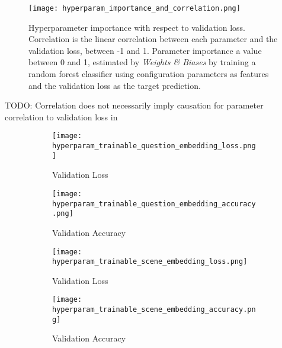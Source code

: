 \begin{figure}
    \centering
    \texttt{[image: hyperparam\_importance\_and\_correlation.png]}
    \caption{Hyperparameter importance with respect to validation loss. Correlation is the linear correlation between each parameter and the validation loss, between -1 and 1. Parameter importance a value between 0 and 1, estimated by \textit{Weights \& Biases} \cite{wandb} by training a random forest classifier using configuration parameters as features and the validation loss as the target prediction.}
    \label{fig:hyperparam_importance_and_correlation}
\end{figure}

{\color{red} TODO: Correlation does not necessarily imply causation for parameter correlation to validation loss in \figureautorefname{ \ref{fig:hyperparam_importance_and_correlation}}}

\begin{figure}
    \centering
    \begin{subfigure}[l]{0.5\textwidth}
        \texttt{[image: hyperparam\_trainable\_question\_embedding\_loss.png]}
        \label{fig:hyperparam_trainable_question_embedding_loss}
        \caption{Validation Loss}
    \end{subfigure}
    \begin{subfigure}[r]{0.49\textwidth}
        \texttt{[image: hyperparam\_trainable\_question\_embedding\_accuracy.png]}
        \label{fig:hyperparam_trainable_question_embedding_accuracy}
        \caption{Validation Accuracy}
    \end{subfigure}
    \caption{}
    \label{fig:hyperparam_trainable_question_embedding_loss_and_accuracy}
\end{figure}
 
\begin{figure}
    \centering
    \begin{subfigure}[l]{0.5\textwidth}
        \texttt{[image: hyperparam\_trainable\_scene\_embedding\_loss.png]}
        \label{fig:hyperparam_trainable_scene_embedding_loss}
        \caption{Validation Loss}
    \end{subfigure}
    \begin{subfigure}[r]{0.49\textwidth}
        \texttt{[image: hyperparam\_trainable\_scene\_embedding\_accuracy.png]}
        \label{fig:hyperparam_trainable_scene_embedding_accuracy}
        \caption{Validation Accuracy}
    \end{subfigure}
    \caption{}
    \label{fig:hyperparam_trainable_scene_embedding_loss_and_accuracy}
\end{figure}

